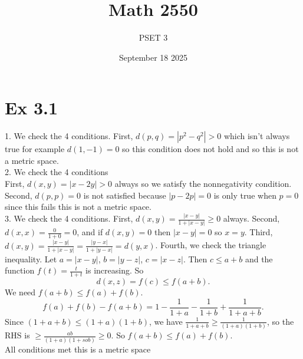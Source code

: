 \documentclass{report}
\title{\Huge{Math 2550}}
\author{\huge{PSET 3}}
\date{September 18 2025}
\begin{document}
\maketitle
\newpage%
\tableofcontents
\pagebreak

\section*{Ex 3.1}

\begin{proofWithHibiscus}
  1. We check the 4 conditions.  
  First, $d(p,q)=|p^2-q^2| > 0$ which isn't always true for example $d(1,-1) = 0$ so this condition does not hold 
  and so this is not a metric space. \\

  2. We check the 4 conditions\\
  First, $d(x,y) = |x - 2y| > 0 $ always so we satisfy the nonnegativity condition.
  Second,  $d(p,p) = 0$ is not satisfied because $|p - 2p| = 0$ is only true when $p = 0$ since this fails this is not a metric space. \\

  3. We check the 4 conditions.  
  First, $d(x,y)=\frac{|x-y|}{1+|x-y|}\geq 0$ always.  
  Second, $d(x,x)=\frac{0}{1+0}=0$, and if $d(x,y)=0$ then $|x-y|=0$ so $x=y$.  
  Third, $d(x,y)=\frac{|x-y|}{1+|x-y|}=\frac{|y-x|}{1+|y-x|}=d(y,x)$.  
  Fourth, we check the triangle inequality. Let $a=|x-y|$, $b=|y-z|$, $c=|x-z|$. Then $c\le a+b$ and the function $f(t)=\tfrac{t}{1+t}$ is increasing. So
  \[
  d(x,z)=f(c)\le f(a+b).
  \]
  We need $f(a+b)\le f(a)+f(b)$.  
  \[
  f(a)+f(b)-f(a+b)=1-\frac{1}{1+a}-\frac{1}{1+b}+\frac{1}{1+a+b}.
  \]
  Since $(1+a+b)\le (1+a)(1+b)$, we have $\frac{1}{1+a+b}\ge \frac{1}{(1+a)(1+b)}$, so the RHS is $\ge \frac{ab}{(1+a)(1+sob)}\ge 0$. So $f(a+b)\le f(a)+f(b)$. \\
  All conditions met this is a metric space
  
\end{proofWithHibiscus}
\end{document}
